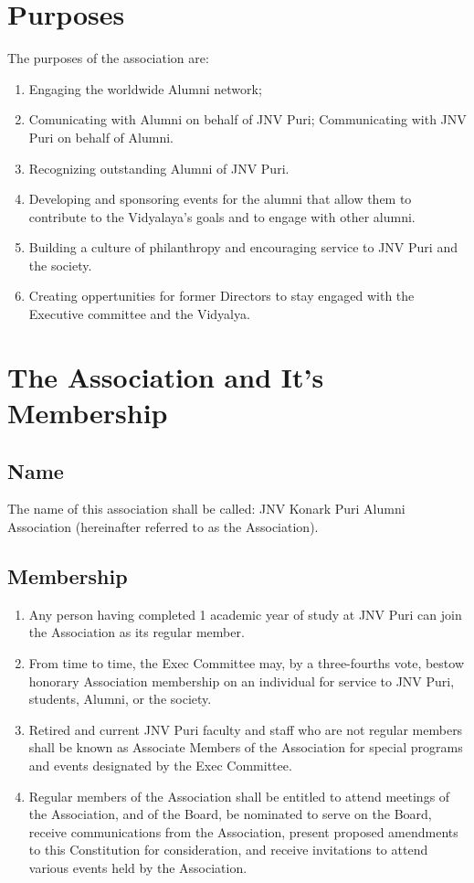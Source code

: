 \documentclass[a4paper,11pt]{book}
\begin{document}
\chapter{Purposes}
The purposes of the association are:
\begin{enumerate}
\item Engaging the worldwide Alumni network;
\item Comunicating with Alumni on behalf of JNV Puri;
Communicating with JNV Puri on behalf of Alumni.
\item Recognizing outstanding Alumni of JNV Puri.
\item Developing and sponsoring events for the alumni that allow them to contribute to the Vidyalaya's goals and to engage with other alumni.
\item Building a culture of philanthropy and encouraging service to JNV Puri and the society.
\item Creating oppertunities for former Directors to stay engaged with the Executive committee and the Vidyalya.
\end{enumerate}


\chapter{The Association and It's Membership}
\section{Name}
The name of this association shall be called: JNV Konark Puri Alumni Association (hereinafter referred to as the Association).

\section{Membership}
\begin{enumerate}
\item Any person having completed 1 academic year of study at JNV Puri can join the Association as its regular member.
\item From time to time, the Exec Committee may, by a three-fourths vote, bestow honorary Association membership on an individual for service to JNV Puri, students, Alumni, or the society.
\item Retired and current JNV Puri faculty and staff who are not regular members shall be known as Associate Members of the Association for special programs and events designated by the Exec Committee.
\item Regular members of the Association shall be entitled to attend meetings of the Association, and of the Board, be nominated to serve on the Board, receive communications from the Association, present proposed amendments to this Constitution for consideration, and receive invitations to attend various events held by the Association.
\end{enumerate}
\end{document}
